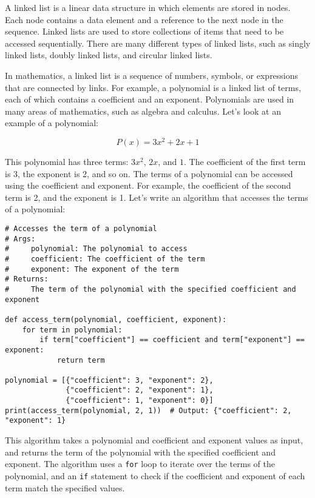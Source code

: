 A linked list is a linear data structure in which elements are stored in nodes. Each node contains a data element and a reference to the next node in the sequence. Linked lists are used to store collections of items that need to be accessed sequentially. There are many different types of linked lists, such as singly linked lists, doubly linked lists, and circular linked lists.

In mathematics, a linked list is a sequence of numbers, symbols, or expressions that are connected by links. For example, a polynomial is a linked list of terms, each of which contains a coefficient and an exponent. Polynomials are used in many areas of mathematics, such as algebra and calculus. Let's look at an example of a polynomial:

\begin{equation}
    P(x) = 3x^2 + 2x + 1
\end{equation}

This polynomial has three terms: $3x^2$, $2x$, and $1$. The coefficient of the first term is 3, the exponent is 2, and so on. The terms of a polynomial can be accessed using the coefficient and exponent. For example, the coefficient of the second term is 2, and the exponent is 1. Let's write an algorithm that accesses the terms of a polynomial:

\begin{lstlisting}
# Accesses the term of a polynomial
# Args:
#     polynomial: The polynomial to access
#     coefficient: The coefficient of the term
#     exponent: The exponent of the term
# Returns:
#     The term of the polynomial with the specified coefficient and exponent

def access_term(polynomial, coefficient, exponent):
    for term in polynomial:
        if term["coefficient"] == coefficient and term["exponent"] == exponent:
            return term

polynomial = [{"coefficient": 3, "exponent": 2},
              {"coefficient": 2, "exponent": 1},
              {"coefficient": 1, "exponent": 0}]
print(access_term(polynomial, 2, 1))  # Output: {"coefficient": 2, "exponent": 1}
\end{lstlisting}

This algorithm takes a polynomial and coefficient and exponent values as input, and returns the term of the polynomial with the specified coefficient and exponent. The algorithm uses a \texttt{for} loop to iterate over the terms of the polynomial, and an \texttt{if} statement to check if the coefficient and exponent of each term match the specified values.

